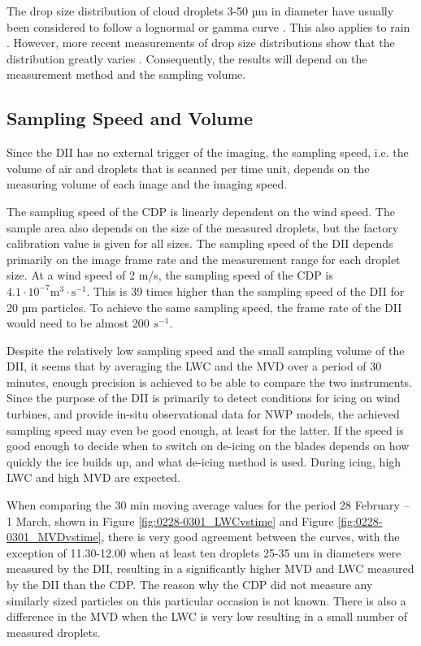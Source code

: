 The drop size distribution of cloud droplets 3-50 µm in diameter have usually been considered to follow a lognormal or gamma curve \cite{miles2000,lee2010,sein1998}. This also applies to rain \cite{ulb1983}. However, more recent measurements of drop size distributions show that the distribution greatly varies \cite{james2001,shaw2002,peters2005,cob2011}. Consequently, the results will depend on the measurement method and the sampling volume.

\subsection{Sampling Speed and Volume}

Since the DII has no external trigger of the imaging, the sampling speed, i.e. the volume of air and droplets that is scanned per time unit, depends on the measuring volume of each image and the imaging speed. 

The sampling speed of the CDP is linearly dependent on the wind speed. The sample area also depends on the size of the measured droplets, but the factory calibration value is given for all sizes. The sampling speed of the DII depends primarily on the image frame rate and the measurement range for each droplet size. At a wind speed of 2 m/s, the sampling speed of the CDP is $\mathrm{4.1 \cdot 10^{-7} m^{3} \cdot s^{-1}}$. This is 39 times higher than the sampling speed of the DII for 20 µm particles. To achieve the same sampling speed, the frame rate of the DII would need to be almost 200 $s^{-1}$. 

Despite the relatively low sampling speed and the small sampling volume of the DII, it seems that by averaging the LWC and the MVD over a period of 30 minutes, enough precision is achieved to be able to compare the two instruments. Since the purpose of the DII is primarily to detect conditions for icing on wind turbines, and provide in-situ observational data for NWP models, the achieved sampling speed may even be good enough, at least for the latter. If the speed is good enough to decide when to switch on de-icing on the blades depends on how quickly the ice builds up, and what de-icing method is used. During icing, high LWC and high MVD are expected.

When comparing the 30 min moving average values for the period 28 February -- 1 March, shown in Figure \ref{fig:0228-0301_LWCvstime} and Figure \ref{fig:0228-0301_MVDvstime}, there is very good agreement between the curves, with the exception of 11.30-12.00 when at least ten droplets 25-35 um in diameters were measured by the DII, resulting in a significantly higher MVD and LWC measured by the DII than the CDP. The reason why the CDP did not measure any similarly sized particles on this particular occasion is not known. There is also a difference in the MVD when the LWC is very low resulting in a small number of measured droplets.

